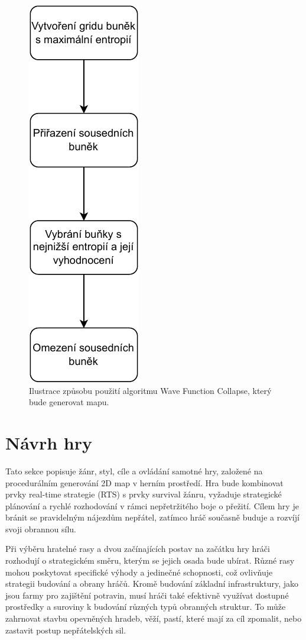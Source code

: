 \begin{figure}[H]
	\centering
	\includegraphics[scale=1]{obrazky-figures/wfcAlgorithm.pdf}
	\caption{Ilustrace způsobu použití algoritmu Wave Function Collapse, který bude generovat mapu.}
	\label{wfcAlgorithm}
\end{figure}

\section{Návrh hry}
\label{GameDesign}
Tato sekce popisuje žánr, styl, cíle a ovládání samotné hry, založené na procedurálním generování 2D map v herním prostředí. Hra bude kombinovat prvky real-time strategie (RTS) s prvky survival žánru, vyžaduje strategické plánování a rychlé rozhodování v rámci nepřetržitého boje o přežití. Cílem hry je bránit se pravidelným nájezdům nepřátel, zatímco hráč současně buduje a rozvíjí svoji obrannou sílu.

Při výběru hratelné rasy a dvou začínajících postav na začátku hry hráči rozhodují o strategickém směru, kterým se jejich osada bude ubírat. Různé rasy mohou poskytovat specifické výhody a jedinečné schopnosti, což ovlivňuje strategii budování a obrany hráčů. Kromě budování základní infrastruktury, jako jsou farmy pro zajištění potravin, musí hráči také efektivně využívat dostupné prostředky a suroviny k budování různých typů obranných struktur. To může zahrnovat stavbu opevněných hradeb, věží, pastí, které mají za cíl zpomalit, nebo zastavit postup nepřátelských sil.


